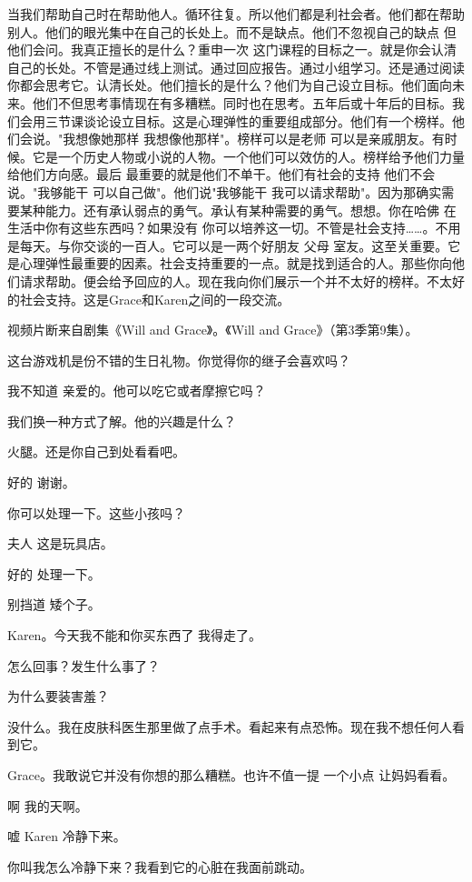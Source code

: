 当我们帮助自己时在帮助他人。循环往复。所以他们都是利社会者。他们都在帮助别人。他们的眼光集中在自己的长处上。而不是缺点。他们不忽视自己的缺点 但他们会问。我真正擅长的是什么？重申一次 这门课程的目标之一。就是你会认清自己的长处。不管是通过线上测试。通过回应报告。通过小组学习。还是通过阅读 你都会思考它。认清长处。他们擅长的是什么？他们为自己设立目标。他们面向未来。他们不但思考事情现在有多糟糕。同时也在思考。五年后或十年后的目标。我们会用三节课谈论设立目标。这是心理弹性的重要组成部分。他们有一个榜样。他们会说。"我想像她那样 我想像他那样"。榜样可以是老师 可以是亲戚朋友。有时候。它是一个历史人物或小说的人物。一个他们可以效仿的人。榜样给予他们力量 给他们方向感。最后 最重要的就是他们不单干。他们有社会的支持 他们不会说。"我够能干 可以自己做"。他们说"我够能干 我可以请求帮助"。因为那确实需要某种能力。还有承认弱点的勇气。承认有某种需要的勇气。想想。你在哈佛 在生活中你有这些东西吗？如果没有 你可以培养这一切。不管是社会支持……。不用是每天。与你交谈的一百人。它可以是一两个好朋友 父母 室友。这至关重要。它是心理弹性最重要的因素。社会支持重要的一点。就是找到适合的人。那些你向他们请求帮助。便会给予回应的人。现在我向你们展示一个并不太好的榜样。不太好的社会支持。这是Grace和Karen之间的一段交流。 

视频片断来自剧集《Will and Grace》。《Will and Grace》（第3季第9集）。 

这台游戏机是份不错的生日礼物。你觉得你的继子会喜欢吗？ 

我不知道 亲爱的。他可以吃它或者摩擦它吗？ 

我们换一种方式了解。他的兴趣是什么？ 

火腿。还是你自己到处看看吧。 

好的 谢谢。 

你可以处理一下。这些小孩吗？ 

夫人 这是玩具店。 

好的 处理一下。 

别挡道 矮个子。 

Karen。今天我不能和你买东西了 我得走了。 

怎么回事？发生什么事了？ 

为什么要装害羞？ 

没什么。我在皮肤科医生那里做了点手术。看起来有点恐怖。现在我不想任何人看到它。 

Grace。我敢说它并没有你想的那么糟糕。也许不值一提 一个小点 让妈妈看看。 

啊 我的天啊。 

嘘 Karen 冷静下来。 

你叫我怎么冷静下来？我看到它的心脏在我面前跳动。 

